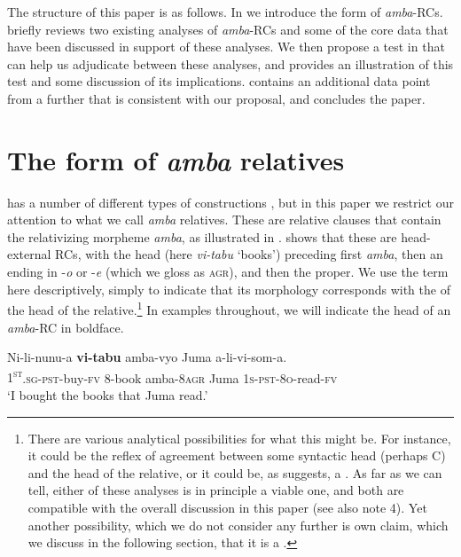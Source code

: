 \documentclass[output=paper
,newtxmath
,modfonts
,nonflat]{langsci/langscibook}
\begin{document}
The structure of this paper is as follows. In  we introduce the form of \textit{amba}{}-RCs.  briefly reviews two existing analyses of \textit{amba}{}-RCs and some of the core data that have been discussed in support of these analyses. We then propose a test in  that can help us adjudicate between these analyses, and  provides an illustration of this test and some discussion of its implications.  contains an additional data point from a further  that is consistent with our proposal, and  concludes the paper. 

\section{The form of \textit{amba} relatives}\label{sec:gould:2}

 has a number of different types of  constructions \citep[cf.][]{Ngonyani2001}, but in this paper we restrict our attention to what we call \textit{amba} relatives. These are relative clauses that contain the relativizing morpheme \textit{amba}, as illustrated in .  shows that these are head-external RCs, with the head (here \textit{vi-tabu} ‘books’) preceding first \textit{amba}, then an  ending in -\textit{o} or -\textit{e} (which we gloss as \textsc{agr}), and then the  proper. \pagebreak We use the term  here descriptively, simply to indicate that its morphology corresponds with the  of the head of the relative.\footnote{There are various analytical possibilities for what this  might be. For instance, it could be the reflex of agreement between some syntactic head (perhaps C) and the head of the relative, or it could be, as \citet{Henderson2006} suggests, a . As far as we can tell, either of these analyses is in principle a viable one, and both are compatible with the overall discussion in this paper (see also note 4). Yet another possibility, which we do not consider any further is  own claim, which we discuss in the following section, that it is a .} In examples throughout, we will indicate the head of an \textit{amba}{}-RC in boldface.

\ea
\gll Ni-li-nunu-a \textbf{vi-tabu} amba-vyo Juma a-li-vi-som-a.\\
\textsc{1\textsuperscript{st}}\textsc{.sg-pst}{}-buy-\textsc{fv} 8-book amba{}-8\textsc{agr} Juma \textsc{1s-pst-8o}{}-read-\textsc{fv}\\
\glt ‘I bought the books that Juma read.’  \label{ex:gould:1}
\z
\end{document}
